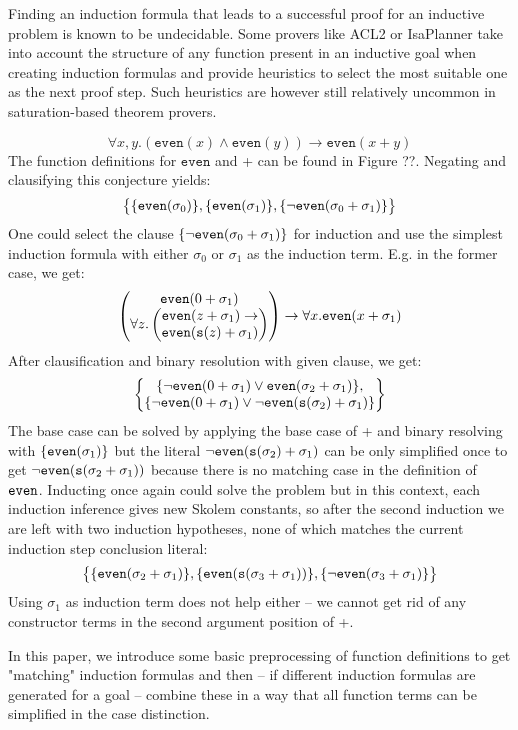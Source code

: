 
Finding an induction formula that leads to a successful proof for an inductive problem is known to be undecidable. Some provers like ACL2 or IsaPlanner take into account the structure of any function present in an inductive goal when creating induction formulas and provide heuristics to select the most suitable one as the next proof step. Such heuristics are however still relatively uncommon in saturation-based theorem provers.
\begin{example}\label{ex:1}
$$\forall x,y. (\mathtt{even}(x)\land \mathtt{even}(y))\rightarrow \mathtt{even}(x+y)$$
The function definitions for $\mathtt{even}$ and + can be found in Figure ??. Negating and clausifying this conjecture yields:
$$\begin{Bmatrix}
\{\mathtt{even}(\sigma_0)\},\{\mathtt{even}(\sigma_1)\},\{\neg\mathtt{even}(\sigma_0+\sigma_1)\}
\end{Bmatrix}$$
One could select the clause $\{\neg\mathtt{even}(\sigma_0+\sigma_1)\}$ for induction and use the simplest induction formula with either $\sigma_0$ or $\sigma_1$ as the induction term. E.g. in the former case, we get:
$$\begin{pmatrix}\mathtt{even}(0+\sigma_1)\\
\forall z.\begin{pmatrix}
\mathtt{even}(z+\sigma_1)\rightarrow\\
\mathtt{even}(\mathtt{s}(z)+\sigma_1)
\end{pmatrix}\end{pmatrix}\rightarrow \forall x.\mathtt{even}(x+\sigma_1)$$
After clausification and binary resolution with given clause, we get:
$$\begin{Bmatrix}
\{\neg\mathtt{even}(0+\sigma_1)\lor \mathtt{even}(\sigma_2+\sigma_1)\},\\
\{\neg\mathtt{even}(0+\sigma_1)\lor \neg\mathtt{even}(\mathtt{s}(\sigma_2)+\sigma_1)\}
\end{Bmatrix}$$
The base case can be solved by applying the base case of + and binary resolving with $\{\mathtt{even}(\sigma_1)\}$ but the literal $\neg\mathtt{even}(\mathtt{s}(\sigma_2)+\sigma_1)$ can be only simplified once to get $\neg\mathtt{even}(\mathtt{s}(\sigma_2+\sigma_1))$ because there is no matching case in the definition of $\mathtt{even}$. Inducting once again could solve the problem but in this context, each induction inference gives new Skolem constants, so after the second induction we are left with two induction hypotheses, none of which matches the current induction step conclusion literal:
$$\begin{Bmatrix}
\{\mathtt{even}(\sigma_2+\sigma_1)\},\{\mathtt{even}(\mathtt{s}(\sigma_3+\sigma_1))\},\{\neg\mathtt{even}(\sigma_3+\sigma_1)\}
\end{Bmatrix}$$
Using $\sigma_1$ as induction term does not help either -- we cannot get rid of any constructor terms in the second argument position of +.
\end{example}
In this paper, we introduce some basic preprocessing of function definitions to get "matching" induction formulas and then -- if different induction formulas are generated for a goal -- combine these in a way that all function terms can be simplified in the case distinction.


